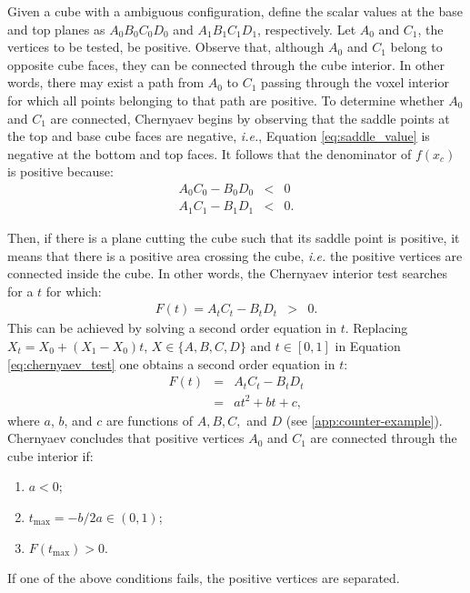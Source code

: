 Given a cube with a ambiguous configuration, define the scalar values at the base and top planes as $A _{0}B_{0}C_{0}D_{0}$ and $A _{1}B_{1}C_{1}D_{1}$, respectively.  Let $A_{0}$ and $C_{1}$, the vertices to be tested, be positive. Observe that, although $A_{0}$ and $C_{1}$ belong to opposite cube faces, they can be connected through the cube interior. In other words, there may exist a path from $A_0$ to $C_1$ passing through the voxel interior for which all points belonging to that path are positive. To determine whether $A_0$ and $C_1$ are connected, Chernyaev begins by observing that the saddle points at the top and base cube faces are negative, \emph{i.e.}, Equation \eqref{eq:saddle_value} is negative at the bottom and top faces. It follows that the denominator of $f(x_c)$ is positive because:
%
%
\begin{eqnarray}
A_0C_0 - B_0D_0 &<& 0 \label{eq:condition1}\\
A_1C_1 - B_1D_1 &<& 0 \label{eq:condition2}.
\end{eqnarray}
%

Then, if there is a plane cutting the cube such that its saddle point is positive, it means that there is a positive area crossing the cube,  \emph{i.e.}  the positive vertices are connected inside the cube.  In other words, the Chernyaev interior test searches for a $t$ for which:
\begin{eqnarray}
F(t) = A_tC_t-B_tD_t &>& 0. \label{eq:chernyaev_test}
\end{eqnarray}
This can be achieved by solving a second order equation in $t$. Replacing $X_t = X_0 + (X_1-X_0)t$,  $X \in \{A, B, C, D\}$ and $t \in [0,1]$ in Equation \eqref{eq:chernyaev_test} one obtains a second order equation in $t$:
\begin{eqnarray}
F(t) &=& A_tC_t-B_tD_t\\
       &=& a t^2 + b t + c  \label{eq:disambiguation},
\end{eqnarray}
where $a$, $b$, and $c$ are functions of $A, B, C,$ and $D$ (see \ref{app:counter-example}). Chernyaev concludes that positive vertices $A_0$ and $C_1$ are connected through the cube interior if: 
\begin{enumerate}
\item $a < 0$;
\item $t_{\mathrm{max}} = -b / 2a \in (0,1)$; 
\item $F(t_{\mathrm{max}}) > 0$. 
\end{enumerate}
If one of the above conditions fails, the positive vertices are separated.

